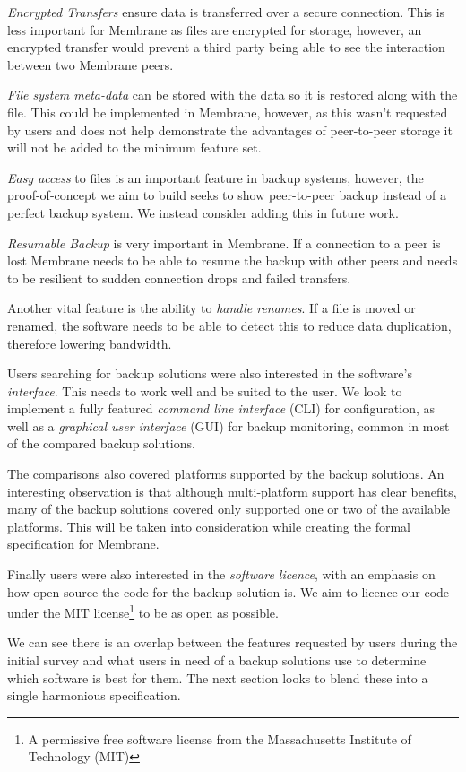 \documentclass[11pt, a4paper, twoside]{report}
\begin{document}
\emph{Encrypted Transfers} ensure data is transferred over a secure connection. This is less important for Membrane as files are encrypted for storage, however, an encrypted transfer would prevent a third party being able to see the interaction between two Membrane peers.

\emph{File system meta-data} can be stored with the data so it is restored along with the file. This could be implemented in Membrane, however, as this wasn't requested by users and does not help demonstrate the advantages of peer-to-peer storage it will not be added to the minimum feature set.

\emph{Easy access} to files is an important feature in backup systems, however, the proof-of-concept we aim to build seeks to show peer-to-peer backup instead of a perfect backup system. We instead consider adding this in future work.

\emph{Resumable Backup} is very important in Membrane. If a connection to a peer is lost Membrane needs to be able to resume the backup with other peers and needs to be resilient to sudden connection drops and failed transfers.

Another vital feature is the ability to \emph{handle renames}. If a file is moved or renamed, the software needs to be able to detect this to reduce data duplication, therefore lowering bandwidth.

Users searching for backup solutions were also interested in the software's \emph{interface}. This needs to work well and be suited to the user. We look to implement a fully featured \emph{command line interface} (CLI) for configuration, as well as a \emph{graphical user interface} (GUI) for backup monitoring, common in most of the compared backup solutions.

The comparisons also covered platforms supported by the backup solutions. An interesting observation is that although multi-platform support has clear benefits, many of the backup solutions covered only supported one or two of the available platforms. This will be taken into consideration while creating the formal specification for Membrane.

Finally users were also interested in the \emph{software licence}, with an emphasis on how open-source the code for the backup solution is. We aim to licence our code under the MIT license\footnote{A permissive free software license from the Massachusetts Institute of Technology (MIT)} to be as open as possible.

We can see there is an overlap between the features requested by users during the initial survey and what users in need of a backup solutions use to determine which software is best for them. The next section looks to blend these into a single harmonious specification.
\end{document}
